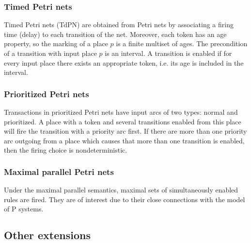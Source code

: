 
\subsubsection{Timed Petri nets} %
\label{ssub:timed_petri_nets}

Timed Petri nets (TdPN) are obtained from Petri nets by associating a firing time (delay) to each transition of the net. Moreover, each token has an age property, so the marking of a place $p$ is a finite multiset of ages. The precondition of a transition with input place $p$ is an interval. A transition is enabled if for every input place there exists an appropriate token, i.e. its age is included in the interval.


\subsubsection{Prioritized Petri nets} %
\label{ssub:prioritized_petri_nets}

Transactions in prioritized Petri nets have input arcs of two types: normal and prioritized. A place with a token and several transitions enabled from this place will fire the transition with a priority arc first. If there are more than one priority arc outgoing from a place which causes that more than one transition is enabled, then the firing choice is nondeterministic.


\subsubsection{Maximal parallel Petri nets} %
\label{ssub:maximal_parallel_petri_nets}

Under the maximal parallel semantics, maximal sets of simultaneously enabled rules are fired. They are of interest due to their close connections with the model of P systems.



\subsection{Other extensions} %
\label{sub:other_extensions}

